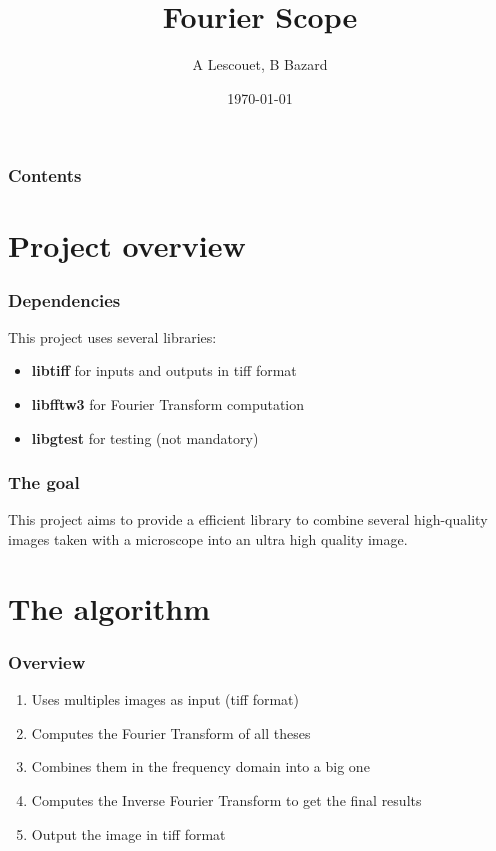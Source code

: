 \documentclass{beamer}
\title[Fourier Scope]{Fourier Scope}
\author{A Lescouet, B Bazard}
\institute[Télécom SudParis]{
  Télécom Sudparis\\
}
\date{\today}
\begin{document}
\begin{frame}
  \titlepage%
\end{frame}

\begin{frame}%
  \frametitle{Contents}
  \tableofcontents
\end{frame}

\section{Project overview}

\begin{frame}
  \frametitle{Dependencies}
  This project uses several libraries:
  \begin{itemize}
  \item \textbf{libtiff} for inputs and outputs in tiff format
  \item \textbf{libfftw3} for Fourier Transform computation
  \item \textbf{libgtest} for testing (not mandatory)
  \end{itemize}
\end{frame}

\begin{frame}
  \frametitle{The goal}
  This project aims to provide a efficient library to combine several
  high-quality images taken with a microscope into an ultra high quality
  image. %
\end{frame}

\section{The algorithm}

\begin{frame}
  \frametitle{Overview}
  \begin{enumerate}
  \item Uses multiples images as input (tiff format)
  \item Computes the Fourier Transform of all theses
  \item Combines them in the frequency domain into a big one
  \item Computes the Inverse Fourier Transform to get the final results
  \item Output the image in tiff format
  \end{enumerate}
\end{frame}

\end{document}

